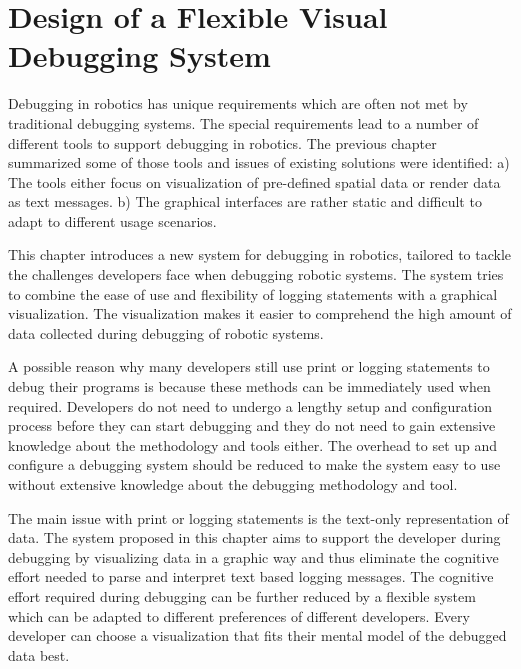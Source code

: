 \chapter{Design of a Flexible Visual Debugging System}
\label{visual_debugging_system}

Debugging in robotics has unique requirements which are often not met by traditional debugging systems. The special requirements lead to a number of different tools to support debugging in robotics. The previous chapter summarized some of those tools and issues of existing solutions were identified: a) The tools either focus on visualization of pre-defined spatial data or render data as text messages. b) The graphical interfaces are rather static and difficult to adapt to different usage scenarios.

This chapter introduces a new system for debugging in robotics, tailored to tackle the challenges developers face when debugging robotic systems. The system tries to combine the ease of use and flexibility of logging statements with a graphical visualization. The visualization makes it easier to comprehend the high amount of data collected during debugging of robotic systems.

A possible reason why many developers still use print or logging statements to debug their programs is because these methods can be immediately used when required. Developers do not need to undergo a lengthy setup and configuration process before they can start debugging and they do not need to gain extensive knowledge about the methodology and tools either. The overhead to set up and configure a debugging system should be reduced to make the system easy to use without extensive knowledge about the debugging methodology and tool.

The main issue with print or logging statements is the text-only representation of data. The system proposed in this chapter aims to support the developer during debugging by visualizing data in a graphic way and thus eliminate the cognitive effort needed to parse and interpret text based logging messages. The cognitive effort required during debugging can be further reduced by a flexible system which can be adapted to different preferences of different developers. Every developer can choose a visualization that fits their mental model of the debugged data best.

